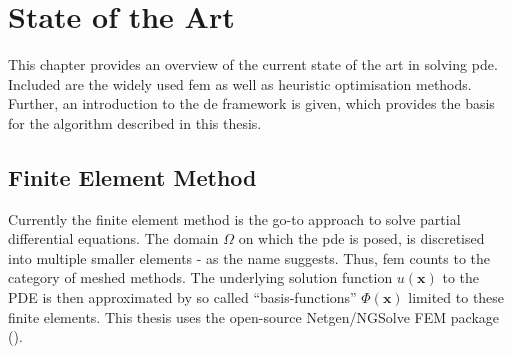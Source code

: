 \documentclass[./\jobname.tex]{subfiles}
\begin{document}
\chapter{State of the Art}
\label{chap:state_of_the_art}
This chapter provides an overview of the current state of the art in solving \gls{pde}. Included are the widely used \gls{fem} as well as heuristic optimisation methods. Further, an introduction to the \gls{de} framework is given, which provides the basis for the algorithm described in this thesis. 

\section{Finite Element Method}
Currently the finite element method is the go-to approach to solve partial differential equations. The domain $\Omega$ on which the \gls{pde} is posed, is discretised into multiple smaller elements - as the name suggests. Thus, \gls{fem} counts to the category of meshed methods. The underlying solution function $u(\mathbf{x})$ to the PDE is then approximated by so called ``basis-functions'' $\Phi(\mathbf{x})$ limited to these finite elements. This thesis uses the open-source Netgen/NGSolve FEM package (\cite{schoberl_ngsolvengsolve_2020}). 
\end{document}
